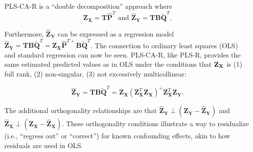 \documentclass[12pt]{article}
\begin{document}
PLS-CA-R is a ``double decomposition'' approach where \begin{equation}
{\mathbf Z}_{\mathbf X} = {\mathbf T}\widehat{\mathbf P}^{T} \text{ and } \widehat{{\mathbf Z}}_{\mathbf Y} = {\mathbf T}{\mathbf B}\widetilde{\mathbf Q}^{T}.
\label{eq:doubledecomp}
\end{equation}

Furthermore, \(\widehat{{\mathbf Z}}_{\mathbf Y}\) can be expressed as a
regression model
\(\widehat{{\mathbf Z}}_{\mathbf Y} = {\mathbf T} {\mathbf B}\widetilde{\mathbf Q}^{T} = {\mathbf Z}_{\mathbf X}\widehat{\mathbf P}^{{T}{+}}{\mathbf B}\widetilde{\mathbf Q}^{T}\).
The connection to ordinary least squares (OLS) and standard regression
can now be seen. PLS-CA-R, like PLS-R, provides the same estimated
predicted values as in OLS under the conditions that \({\bf Z}_{\bf X}\)
is (1) full rank, (2) non-singular, (3) not excessively multicollinear:

\begin{equation}
\widehat{{\mathbf Z}}_{\mathbf Y} = {\mathbf T} {\mathbf B}\widetilde{\mathbf Q}^{T} = {\mathbf Z}_{\mathbf X} ({\mathbf Z}_{\mathbf X}^{T}{\mathbf Z}_{\mathbf X})^{+} {\mathbf Z}_{\mathbf X}^T {\mathbf Z}_{\mathbf Y}.
\label{ols_equivalence}
\end{equation}

The additional orthogonality relationships are that
\(\widehat{{\mathbf Z}}_{\mathbf Y} \perp ({\mathbf Z}_{\mathbf Y} - \widehat{{\mathbf Z}}_{\mathbf Y})\)
and
\(\widehat{{\mathbf Z}}_{\mathbf X} \perp ({\mathbf Z}_{\mathbf X} - \widehat{{\mathbf Z}}_{\mathbf X})\).
These orthogonality conditions illustrate a way to residualize (i.e.,
``regress out'' or ``correct'') for known confounding effects, akin to
how residuals are used in OLS.
\end{document}
